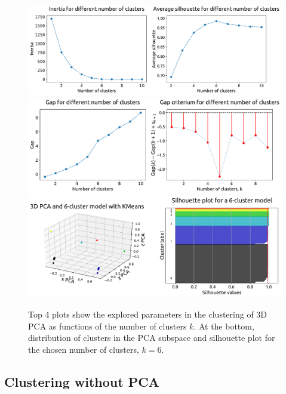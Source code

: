 \documentclass[12pt,a4paper]{article}
\begin{document}
\begin{figure}[ht!]
\centering
\includegraphics[width=\textwidth]{figs/PCA_3D_parfigs_1.pdf}
\includegraphics[width=\textwidth]{figs/PCA_3D_parfigs_2.pdf}
\includegraphics[width=\textwidth]{figs/PCA_3D_clusfigs_6_cluster.pdf}
\caption{Top 4 plots show the explored parameters in the clustering of 3D PCA as functions of the number of clusters $k$. At the bottom, distribution of clusters in the PCA subspace and silhouette plot for the chosen number of clusters, $k = 6$.}
\label{PCA_3D_parfigs}
\end{figure}

\clearpage

\subsection{Clustering without PCA}
\end{document}
